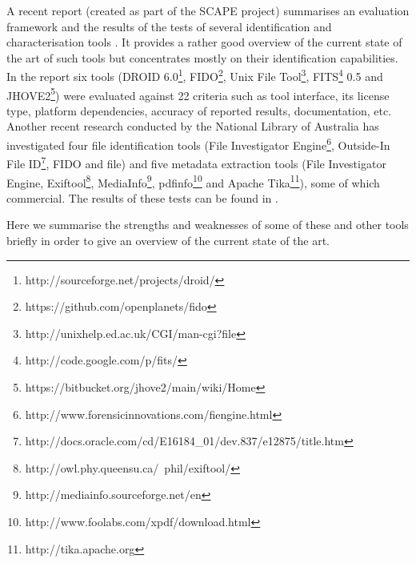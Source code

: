 A recent report (created as part of the SCAPE project) summarises an evaluation framework and the results of the tests of several identification and characterisation tools \cite{Knijff:2011it}. It provides a rather good overview of the current state of the art of such tools but concentrates mostly on their identification capabilities. In the report six tools (DROID 6.0\footnote{http://sourceforge.net/projects/droid/}, FIDO\footnote{https://github.com/openplanets/fido}, Unix File Tool\footnote{http://unixhelp.ed.ac.uk/CGI/man-cgi?file}, FITS\footnote{http://code.google.com/p/fits/} 0.5 and JHOVE2\footnote{https://bitbucket.org/jhove2/main/wiki/Home}) were evaluated against 22 criteria such as tool interface, its license type, platform dependencies, accuracy of reported results, documentation, etc. Another recent research conducted by the National Library of Australia has investigated four file identification tools (File Investigator Engine\footnote{http://www.forensicinnovations.com/fiengine.html}, Outside-In File ID\footnote{http://docs.oracle.com/cd/E16184\_01/dev.837/e12875/title.htm}, FIDO and file) and five metadata extraction tools (File Investigator Engine, Exiftool\footnote{http://owl.phy.queensu.ca/~phil/exiftool/}, MediaInfo\footnote{http://mediainfo.sourceforge.net/en}, pdfinfo\footnote{http://www.foolabs.com/xpdf/download.html} and Apache Tika\footnote{http://tika.apache.org}), some of which commercial. The results of these tests can be found in \cite{NLASP2452}.

Here we summarise the strengths and weaknesses of some of these and other tools briefly in order to give an overview of the current state of the art.

